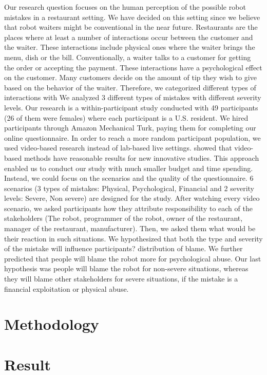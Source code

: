 \documentclass{sigchi}
\begin{document}
Our research question focuses on the human perception of the possible robot mistakes in a restaurant setting. We have decided on this setting since we believe that robot waiters might be conventional in the near future. Restaurants are the places where at least a number of interactions occur between the customer and the waiter. These interactions include physical ones where the waiter brings the menu, dish or the bill. Conventionally, a waiter talks to a customer for getting the order or accepting the payment. These interactions have a psychological effect on the customer. Many customers decide on the amount of tip they wish to give based on the behavior of the waiter. Therefore, we categorized different types of interactions with  We analyzed 3 different types of mistakes with different severity levels. Our research is a within-participant study conducted with 49 participants (26 of them were females) where each participant is a U.S. resident. We hired participants through Amazon Mechanical Turk, paying them for completing our online questionnaire. In order to reach a more random participant population, we used video-based research instead of lab-based live settings. \cite{woods2006comparing} showed that video-based methods have reasonable results for new innovative studies. This approach enabled us to conduct our study with much smaller budget and time spending. Instead, we could focus on the scenarios and the quality of the questionnaire. 6 scenarios (3 types of mistakes: Physical, Psychological, Financial and 2 severity levels: Severe, Non severe) are designed for the study. After watching every video scenario, we asked participants how they attribute responsibility to each of the stakeholders (The robot, programmer of the robot, owner of the restaurant, manager of the restaurant, manufacturer). Then, we asked them what would be their reaction in such situations. We hypothesized that both the type and severity of the mistake will influence participants? distribution of blame. We further predicted that people will blame the robot more for psychological abuse. Our last hypothesis was people will blame the robot for non-severe situations, whereas they will blame other stakeholders for severe situations, if the mistake is a financial exploitation or physical abuse.

\section{Methodology}
\section{Result}
\end{document}
